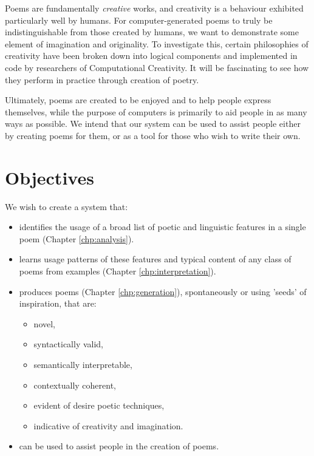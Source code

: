 Poems are fundamentally \textit{creative} works, and creativity is a behaviour exhibited particularly well by humans. For computer-generated poems to truly be indistinguishable from those created by humans, we want to demonstrate some element of imagination and originality. To investigate this, certain philosophies of creativity have been broken down into logical components and implemented in code by researchers of Computational Creativity. It will be fascinating to see how they perform in practice through creation of poetry.

Ultimately, poems are created to be enjoyed and to help people express themselves, while the purpose of computers is primarily to aid people in as many ways as possible. We intend that our system can be used to assist people either by creating poems for them, or as a tool for those who wish to write their own.


\section{Objectives}
We wish to create a system that:
\begin{itemize}
\item{identifies the usage of a broad list of poetic and linguistic features in a single poem (Chapter \ref{chp:analysis}).}
\item{learns usage patterns of these features and typical content of any class of poems from examples (Chapter \ref{chp:interpretation}).}
\item{produces poems (Chapter \ref{chp:generation}), spontaneously or using 'seeds' of inspiration, that are:}
	\begin{itemize}
	\setlength{\itemsep}{0pt}
	\item{novel,}
	\item{syntactically valid,}
	\item{semantically interpretable,}
	\item{contextually coherent,}
	\item{evident of desire poetic techniques,}
	\item{indicative of creativity and imagination.}
	\end{itemize} 
\item{can be used to assist people in the creation of poems.}
\end{itemize}


